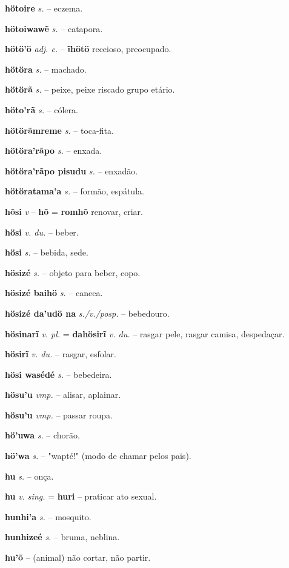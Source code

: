 \textbf{hötoire} \textit{s.} -- eczema.

\textbf{hötoiwawẽ} \textit{s.} -- catapora.

\textbf{hötö'ö} \textit{adj. c.} -- \textbf{ĩhötö} receioso, preocupado.

\textbf{hötöra} \textit{s.} -- machado.

\textbf{hötörã} \textit{s.} -- peixe, peixe riscado  grupo etário.

\textbf{höto'rã} \textit{s.} -- cólera.

\textbf{hötörãmreme} \textit{s.} -- toca-fita.

\textbf{hötöra'rãpo} \textit{s.} -- enxada.

\textbf{hötöra'rãpo pisudu} \textit{s.} -- enxadão.

\textbf{hötöratama'a} \textit{s.} -- formão, espátula.

\textbf{hõsi} \textit{v} -- \textbf{hõ} = \textbf{romhõ} renovar, criar.

\textbf{hösi} \textit{v. du.} -- beber.

\textbf{hösi} \textit{s.} -- bebida, sede.

\textbf{hösizé} \textit{s.} -- objeto para beber, copo.

\textbf{hösizé baihö} \textit{s.} -- caneca.

\textbf{hösizé da'udö na} \textit{s./v./posp.} -- bebedouro.

\textbf{hösinarĩ} \textit{v. pl.} = \textbf{dahösirĩ} \textit{v. du.} -- rasgar pele, rasgar camisa, despedaçar.

\textbf{hösirĩ} \textit{v. du.} -- rasgar, esfolar.

\textbf{hösi wasédé} \textit{s.} -- bebedeira.

\textbf{hösu'u} \textit{vmp.} -- alisar, aplainar.

\textbf{hösu'u} \textit{vmp.} -- passar roupa.

\textbf{hö'uwa} \textit{s.} -- chorão.

\textbf{hö'wa} \textit{s.} -- "wapté!" (modo de chamar pelos pais).

\textbf{hu} \textit{s.} -- onça.

\textbf{hu} \textit{v. sing.} = \textbf{huri} -- praticar ato sexual.

\textbf{hunhi'a} \textit{s.} -- mosquito.

\textbf{hunhizeé} \textit{s.} -- bruma, neblina.

\textbf{hu'õ} -- (animal) não cortar, não partir.

